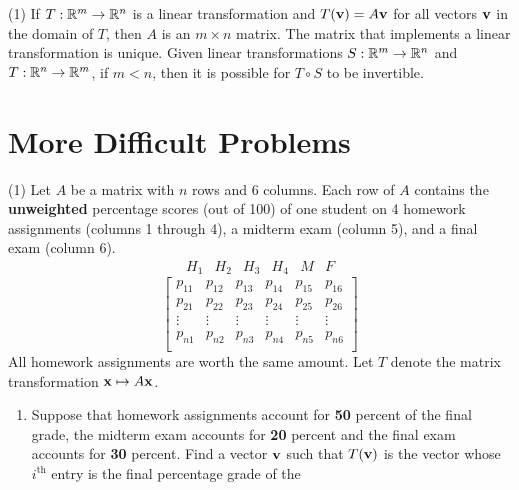 \begin{tasks}[resume, style=enumerate](1)
\task
  If $T : \mathbb R^m \to \mathbb R^n$ is a linear transformation and $T(\mathbf v) = A
  \mathbf v$ for all vectors $\mathbf v$ in the domain of $T$, then $A$ is an $m
  \times n$ matrix.
\task
  The matrix that implements a linear transformation is unique.
\task
  Given linear transformations $S : \mathbb R^m \to \mathbb R^n$ and $T : \mathbb R^n \to
  \mathbb R^m$, if $m < n$, then it is possible for $T \circ S$ to be
  invertible.
\end{tasks}

\section{More Difficult Problems}

\begin{tasks}[resume, style=enumerate](1)
\task
  Let $A$ be a matrix with $n$ rows and 6 columns.  Each row of $A$
  contains the \textbf{unweighted} percentage scores (out of 100) of
  one student on 4 homework assignments (columns 1 through 4), a
  midterm exam (column 5), and a final exam (column 6).
  \begin{displaymath}
    \begin{matrix}
      H_1 & H_2 & H_3 & H_4 & M & F
    \end{matrix}
  \end{displaymath}
  \begin{displaymath}
    \begin{bmatrix}
      p_{11} & p_{12} & p_{13} & p_{14} & p_{15} & p_{16} \\ p_{21} &
      p_{22} & p_{23} & p_{24} & p_{25} & p_{26} \\ \vdots & \vdots &
      \vdots & \vdots & \vdots & \vdots \\ p_{n1} & p_{n2} & p_{n3} &
      p_{n4} & p_{n5} & p_{n6} \\
    \end{bmatrix}
  \end{displaymath}
  All homework assignments are worth the same amount.  Let $T$ denote
  the matrix transformation $\mathbf x \mapsto A \mathbf x$.
  \begin{enumerate}[label=(\alph*)]
  \item
    Suppose that homework assignments account for \textbf{50} percent
    of the final grade, the midterm exam accounts for \textbf{20}
    percent and the final exam accounts for \textbf{30} percent.  Find
    a vector $\mathbf v$ such that $T(\mathbf v)$ is the vector whose
    $i^\text{th}$ entry is the final percentage grade of the

\end{enumerate}
\end{tasks}
